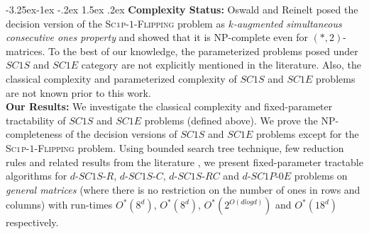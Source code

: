 \documentclass[review, 1p]{elsarticle}
\makeatletter
\renewcommand{\paragraph}{\@startsection{paragraph}{4}{\z@}%
       {-3.25ex\@plus -1ex \@minus -.2ex}%
       {1.5ex \@plus .2ex}%
       {\normalfont\normalsize\bfseries}}
\makeatother
\begin{document}
\newline
\noindent{}
\paragraph{} \textbf{Complexity Status:} Oswald and Reinelt \cite{oswald2009simultaneous} posed the decision version of the \textsc{Sc$ \mathsmaller 1$p-$1$-Flipping} problem as \textit{$k$-augmented simultaneous consecutive ones property} and showed that it is NP-complete even for $(*,2)$-matrices. To the best of our knowledge, the parameterized problems posed under $SC1S$ and $SC1E$ category are not explicitly mentioned in the literature. Also, the classical complexity and parameterized complexity of $SC1S$ and $SC1E$ problems are not known prior to this work.\\ 

\noindent \textbf{Our Results:} We investigate the classical complexity and fixed-parameter tractability of $SC1S$ and $SC1E$ problems (defined above). We prove the NP-completeness of the decision versions of $SC1S$ and $SC1E$ problems except for the \textsc{Sc$ \mathsmaller 1$p-$1$-Flipping} problem. Using bounded search tree technique, few reduction rules and related results from the literature \cite{cao2016chordal,kaplan1999tractability}, we present fixed-parameter tractable algorithms for $d$-$SC1S$-$R$, $d$-$SC1S$-$C$, $d$-$SC1S$-$RC$ and $d$-$SC1P$-$0E$ problems on \textit{general matrices} (where there is no restriction on the number of ones in rows and columns) with run-times $O^{*}(8^{d})$, $O^{*}(8^{d})$, $O^{*}(2^{O(dlogd)})$ and $O^{*}(18^{d})$ respectively. 
\end{document}
